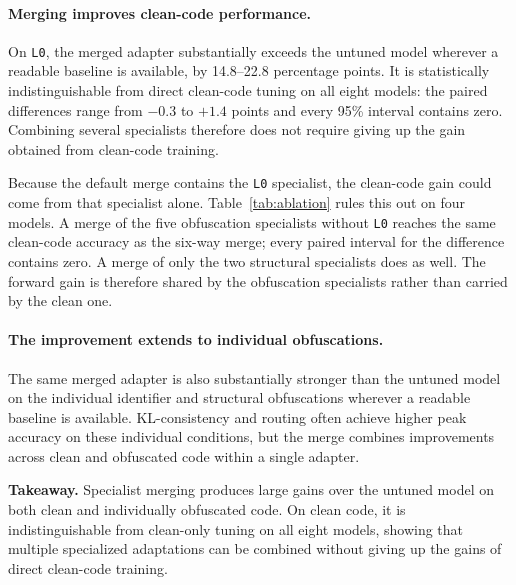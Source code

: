 \paragraph{Merging improves clean-code performance.}
On \texttt{L0}, the merged adapter substantially exceeds the untuned model
wherever a readable baseline is available, by 14.8--22.8 percentage points.
It is statistically indistinguishable from direct clean-code tuning on all
eight models: the paired differences range from $-0.3$ to $+1.4$ points and
every 95\% interval contains zero. Combining several specialists therefore
does not require giving up the gain obtained from clean-code training.

Because the default merge contains the \texttt{L0} specialist, the clean-code
gain could come from that specialist alone. Table~\ref{tab:ablation} rules this
out on four models. A merge of the five obfuscation specialists without
\texttt{L0} reaches the same clean-code accuracy as the six-way merge; every
paired interval for the difference contains zero. A merge of only the two
structural specialists does as well. The forward gain is therefore shared by
the obfuscation specialists rather than carried by the clean one.



\paragraph{The improvement extends to individual obfuscations.}
The same merged adapter is also substantially stronger than the untuned model
on the individual identifier and structural obfuscations wherever a readable
baseline is available. KL-consistency and routing often achieve higher peak
accuracy on these individual conditions, but the merge combines improvements
across clean and obfuscated code within a single adapter.

\begin{takeaway}
\textbf{Takeaway.}
Specialist merging produces large gains over the untuned model on both clean
and individually obfuscated code. On clean code, it is indistinguishable
from clean-only tuning on all eight models, showing that multiple specialized
adaptations can be combined without giving up the gains of direct clean-code
training.
\end{takeaway}

\FloatBarrier



